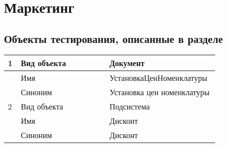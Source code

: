 \section{Маркетинг}
\subsection{Объекты тестирования, описанные в разделе}

\begin{longtable}{p{0.05\linewidth}p{0.4\linewidth}p{0.4\linewidth}}
    \hline
    1 & Вид объекта & Документ \\
    \hline
    & Имя & УстановкаЦенНоменклатуры \\
    \hline
    & Синоним  & Установка цен номенклатуры \\
    \hline
    2 & Вид объекта  & Подсистема \\
    \hline
    & Имя & Дисконт \\
    \hline
    & Синоним  & Дисконт \\
    \hline

    \bottomrule %
\end{longtable}